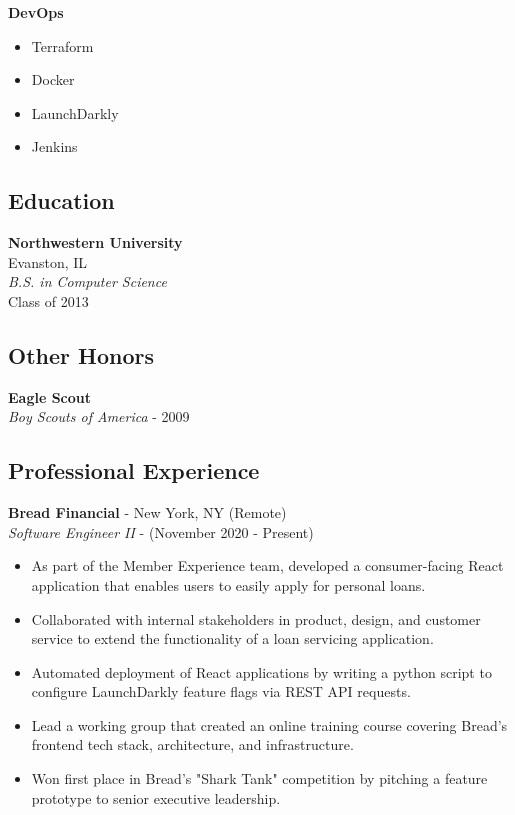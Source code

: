 \documentclass[10pt]{article}
\begin{document}
\begin{paracol}{2}
    \noindent \textbf{DevOps}
    \begin{itemize}
        \item Terraform
        \item Docker
        \item LaunchDarkly
        \item Jenkins
    \end{itemize}

    \subsection*{Education}
    \textbf{Northwestern University} \\
    Evanston, IL \\
    \textit{B.S. in Computer Science}  \\
    {\footnotesize{Class of 2013}}

    \subsection*{Other Honors}
    \textbf{Eagle Scout} \\
    \textit{Boy Scouts of America} - {\footnotesize{2009}}

    \switchcolumn

    \subsection*{Professional Experience}

    \textbf{Bread Financial} - New York, NY (Remote) \\
    \textit{Software Engineer II} - {\footnotesize{(November 2020 - Present)}}
    \begin{itemize}
        \item As part of the Member Experience team, developed a consumer-facing React application that enables users to easily apply for personal loans.
        \item Collaborated with internal stakeholders in product, design, and customer service to extend the functionality of a loan servicing application.
        \item Automated deployment of React applications by writing a python script to configure LaunchDarkly feature flags via REST API requests.
        \item Lead a working group that created an online training course covering Bread's frontend tech stack, architecture, and infrastructure.
        \item Won first place in Bread's "Shark Tank" competition by pitching a feature prototype to senior executive leadership.
    \end{itemize}


\end{paracol}
\end{document}
